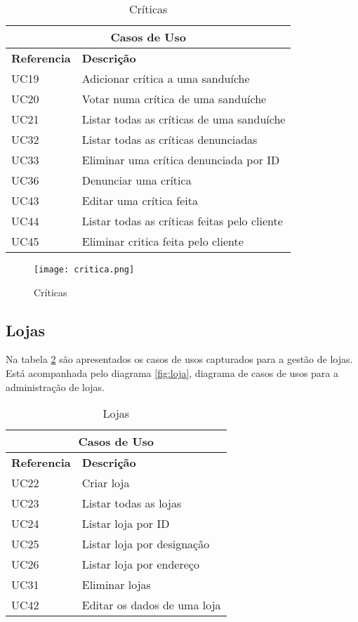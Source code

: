 \begin{table}[H]
\caption{Críticas}
\label{table:criticas}
\begin{center}
\begin{tabular}{ |p{2cm}|p{10cm}|  }
\hline
\multicolumn{2}{|c|}{Casos de Uso} \\
\hline
\textbf{Referencia} & \textbf{Descrição} \\
\hline
UC19 & Adicionar crítica a uma sanduíche\\
\hline
UC20 & Votar numa crítica de uma sanduíche\\
\hline
UC21 & Listar todas as críticas de uma sanduíche\\
\hline
UC32 & Listar todas as críticas denunciadas\\
\hline
UC33 & Eliminar uma crítica denunciada por ID\\
\hline
UC36 & Denunciar uma crítica\\
\hline
UC43 & Editar uma crítica feita\\
\hline
UC44 & Listar todas as críticas feitas pelo cliente\\
\hline
UC45 & Eliminar critica feita pelo cliente\\

\hline
\end{tabular} 
\end{center}
\end{table}


\begin{figure}[H]
    \centering
    \texttt{[image: critica.png]}
    \caption{Críticas}
    \label{fig:criticas}
\end{figure}
\newpage

\subsection{Lojas}

Na tabela \ref{table:lojas} são apresentados os casos de usos capturados para a gestão de lojas. Está acompanhada pelo diagrama \ref{fig:loja}, diagrama de casos de usos para a administração de lojas.

\begin{table}[H]
\caption{Lojas}
\label{table:lojas}
\begin{center}
\begin{tabular}{ |p{2cm}|p{10cm}|  }
\hline
\multicolumn{2}{|c|}{Casos de Uso} \\
\hline
\textbf{Referencia} & \textbf{Descrição} \\
\hline
UC22 & Criar loja\\
\hline
UC23 & Listar todas as lojas\\
\hline
UC24 & Listar loja por ID\\
\hline
UC25 & Listar loja por designação\\
\hline
UC26 & Listar loja por endereço\\
\hline
UC31 & Eliminar lojas\\
\hline
UC42 & Editar os dados de uma loja\\
\hline
\end{tabular} 
\end{center}
\end{table}

